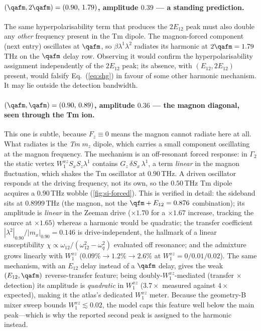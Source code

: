 \paragraph{$(\qafm,2\qafm)=(0.90,\,1.79)$, amplitude $0.39$ --- a
standing prediction.}
The same hyperpolarisability term that produces the $2E_{12}$ peak must
also double any \emph{other} frequency present in the Tm dipole.  The
magnon-forced component (next entry) oscillates at $\qafm$, so
$\beta\lambda^1\lambda^2$ radiates its harmonic at $2\qafm=1.79$\,THz
on the $\qafm$ delay row.  Observing it would confirm the
hyperpolarisability assignment independently of the $2E_{12}$ peak;
its absence, with $(E_{12},2E_{12})$ present, would falsify
Eq.~(\ref{eq:shg}) in favour of some other harmonic mechanism.  It may
lie outside the detection bandwidth.

\paragraph{$(\qafm,\qafm)=(0.90,\,0.89)$, amplitude $0.36$ --- the
magnon diagonal, seen through the Tm ion.}
This one is subtle, because $F_z\equiv0$ means the magnon cannot
radiate here at all.  What radiates is the \emph{Tm} $m_z$ dipole,
which carries a small component oscillating at the magnon frequency.
The mechanism is an off-resonant forced response: in $\Gamma_2$ the
static vertex $W^{xz}_1S_xS_z\lambda^1$ contains
$G_z\,\delta S_x\,\lambda^1$, a term \emph{linear} in the magnon
fluctuation, which shakes the Tm oscillator at $0.90$\,THz.  A driven
oscillator responds at the driving frequency, not its own, so the
$0.50$\,THz Tm dipole acquires a $0.90$\,THz wobble
(\cref{fig:si-forced}).  This is verified in detail: the sideband sits
at $0.8999$\,THz (the magnon, not the $\qfm+E_{12}=0.876$
combination); its amplitude is \emph{linear} in the Zeeman drive
($\times1.70$ for a $\times1.67$ increase, tracking the source at
$\times1.65$) whereas a harmonic would be quadratic; the transfer
coefficient $|\lambda^2|_{0.90}/|m_x|_{0.90}=0.146$ is
drive-independent, the hallmark of a linear susceptibility
$\chi\propto\omega_{12}/(\omega_{12}^2-\omega_q^2)$ evaluated off
resonance; and the admixture grows linearly with $W^{xz}_1$
($0.09\%\to1.2\%\to2.6\%$ at $W^{xz}_1=0/0.01/0.02$).
The same mechanism, with an $E_{12}$ delay instead of a $\qafm$ delay,
gives the weak $(E_{12},\qafm)$ reverse-transfer feature; being
doubly-$W^{xz}_1$-mediated (transfer $\times$ detection) its amplitude
is \emph{quadratic} in $W^{xz}_1$ ($3.7\times$ measured against
$4\times$ expected), making it the atlas's dedicated $W^{xz}_1$ meter.
Because the geometry-B mixer sweep bounds $W^{xz}_1\lesssim0.02$, the
model caps this feature well below the main peak---which is why the
reported second peak is assigned to the harmonic instead.

